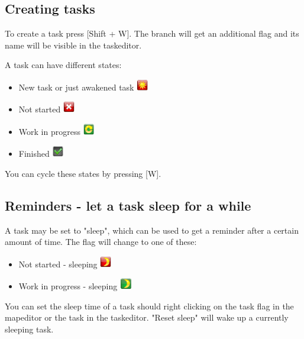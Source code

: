 \documentclass[12pt,a4paper]{article}
\newcommand{\key}[1]{[#1]}
\begin{document}
\subsection{Creating tasks}
To create a task press \key{Shift + W}. The branch will get an
additional flag and its name will be visible in the taskeditor.

A task can have different states:
\begin{itemize}
    \item New task or just awakened task \includegraphics[width=0.5cm]{images/flags/system/task-new.png}
    \item Not started \includegraphics[width=0.5cm]{images/flags/system/task-not-started.png}
    \item Work in progress \includegraphics[width=0.5cm]{images/flags/system/task-wip.png}
    \item Finished \includegraphics[width=0.5cm]{images/flags/system/task-finished.png}
\end{itemize}
You can cycle these states by pressing \key{W}. 

\subsection{Reminders - let a task sleep for a while}
A task may be set to "sleep", which can be used to get a reminder
after a certain amount of time. The flag will change to one of these:
\begin{itemize}
    \item Not started - sleeping
    \includegraphics[width=0.5cm]{images/flags/system/task-new-sleeping.png}
    \item Work in progress - sleeping
    \includegraphics[width=0.5cm]{images/flags/system/task-wip-sleeping.png}
\end{itemize}
You can set the sleep time of a task should right clicking on the task flag in the
mapeditor or the task in the taskeditor. "Reset sleep" will wake up
a currently sleeping task. 
\end{document}
